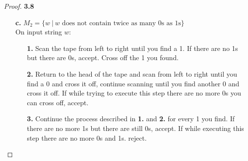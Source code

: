 \documentclass[11pt]{article}
\theoremstyle{definition}
\begin{document}
\begin{proof}{\textbf{3.8}}
\begin{itemize}
    \item [\textbf{c.}]
    $M_2 = \{w~|~w \text{ does not contain twice as many 0s as 1s}\}$\\
    On input string $w$:
    \begin{itemize}
        \item [\textbf{1.}] Scan the tape from left to right until you find a 1.
        If there are no 1s but there are 0s, accept. Cross off the 1 you found.
        \item [\textbf{2.}] Return to the head of the tape and scan from left
        to right until you find a 0 and cross it off, continue scanning until
        you find another 0 and cross it off. If while trying to execute this
        step there are no more 0s you can cross off, accept.
        \item [\textbf{3.}] Continue the process described in \textbf{1.} and
        \textbf{2.} for every 1 you find. If there are no more 1s but there are
        still 0s, accept. If while executing this step there are no more 0s and
        1s. reject.
    \end{itemize}
\end{itemize}
\end{proof}
\end{document}
